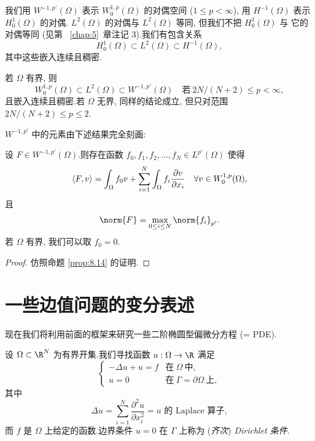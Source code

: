 \begin{notation}
我们用 $W^{-1,p'}(\Omega)$ 表示 $W_0^{1,p}(\Omega)$ 的对偶空间
($1\le p<\infty$), 用 $H^{-1}(\Omega)$ 表示 $H_0^1(\Omega)$ 的对偶.
$L^2(\Omega)$ 的对偶与 $L^2(\Omega)$ 等同, 但我们不把 $H_0^1(\Omega)$ 与
它的对偶等同 (见第~
\ref{chap:5}~章注记 3).我们有包含关系
\begin{equation*}
H_0^1(\Omega)\subset L^2(\Omega)\subset H^{-1}(\Omega),
\end{equation*}
其中这些嵌入连续且稠密.

若 $\Omega$ 有界, 则
\begin{equation*}
W_0^{1,p}(\Omega)\subset L^2(\Omega)\subset W^{-1,p'}(\Omega)
\quad\text{若}\ 2N/(N+2)\le p<\infty,
\end{equation*}
且嵌入连续且稠密.若 $\Omega$ 无界, 同样的结论成立, 但只对范围
$2N/(N+2)\le p\le2$.
\end{notation}

$W^{-1,p'}$ 中的元素由下述结果完全刻画:

\begin{proposition}
\label{prop:9.20}
设 $F\in W^{-1,p'}(\Omega)$.则存在函数
$f_0,f_1,f_2,\dots,f_N\in L^{p'}(\Omega)$ 使得
\begin{equation*}
\left\langle F,v\right\rangle=\int_\Omega f_0v+\sum_{i=1}^N\int_\Omega
f_i\frac{\partial v}{\partial x_i}\quad\forall v\in W_0^{1,p}(\Omega),
\end{equation*}
且
\begin{equation*}
\norm{F}=\max_{0\le i\le N}\norm{f_i}_{p'}.
\end{equation*}
若 $\Omega$ 有界, 我们可以取 $f_0=0$.
\end{proposition}

\begin{proof}
仿照命题  \ref{prop:8.14} 的证明.
\end{proof}

\section{
一些边值问题的变分表述}
\label{sec:9.5}

现在我们将利用前面的框架来研究一些二阶椭圆型偏微分方程 (= PDE).

\begin{example}
\label{ex:9.1}
设 $\Omega\subset\R^N$ 为有界开集.我们寻找函数 $u:\Omega\to\R$ 满足
\begin{equation}
\begin{cases}
-\Delta u+u=f & \text{在}\ \Omega\ \text{中},\\
u=0 & \text{在}\ \Gamma=\partial\Omega\ \text{上},
\end{cases}
\label{eq:9.31}
\end{equation}
其中
\begin{equation*}
\Delta u=\sum_{i=1}^N\frac{\partial^2u}{\partial x_i^2}
=\text{$u$ 的 Laplace 算子},
\end{equation*}
而 $f$ 是 $\Omega$ 上给定的函数.边界条件 $u=0$ 在 $\Gamma$ 上称为
(\emph{齐次}) \emph{Dirichlet 条件}.
\end{example}

